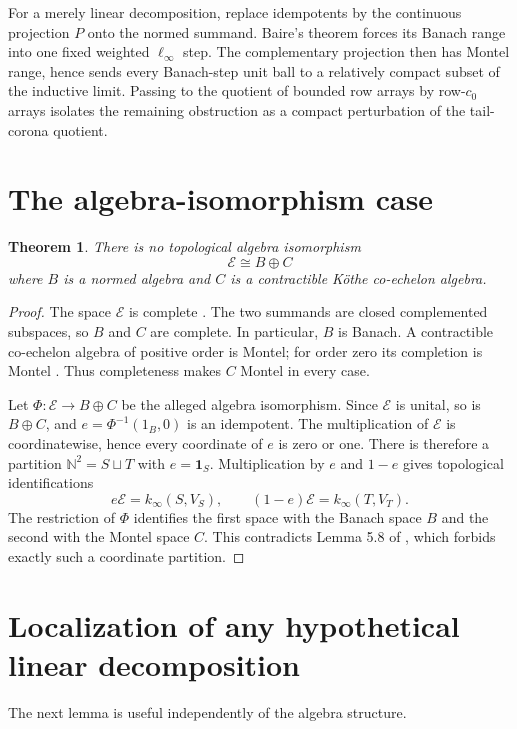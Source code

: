\documentclass[10pt]{article}
\newtheorem{theorem}{Theorem}
\newcommand{\N}{\mathbb N}
\newcommand{\E}{\mathcal E}
\begin{document}
For a merely linear decomposition, replace idempotents by the continuous
projection $P$ onto the normed summand.  Baire's theorem forces its Banach
range into one fixed weighted $\ell_\infty$ step.  The complementary projection
then has Montel range, hence sends every Banach-step unit ball to a relatively
compact subset of the inductive limit.  Passing to the quotient of bounded row
arrays by row-$c_0$ arrays isolates the remaining obstruction as a compact
perturbation of the tail-corona quotient.

\section*{The algebra-isomorphism case}

\begin{theorem}\label{thm:algebra}
There is no topological algebra isomorphism
\[
             \E\cong B\oplus C
\]
where $B$ is a normed algebra and $C$ is a contractible K\"othe co-echelon
algebra.
\end{theorem}

\begin{proof}
The space $\E$ is complete \cite[Theorem 2.3]{BMS}.  The two summands are
closed complemented subspaces, so $B$ and $C$ are complete.  In particular,
$B$ is Banach.  A contractible co-echelon algebra of positive order is Montel;
for order zero its completion is Montel \cite[Theorems 12 and 13]{Piszczek}.
Thus completeness makes $C$ Montel in every case.

Let $\Phi:\E\to B\oplus C$ be the alleged algebra isomorphism.  Since $\E$ is
unital, so is $B\oplus C$, and $e=\Phi^{-1}(1_B,0)$ is an idempotent.  The
multiplication of $\E$ is coordinatewise, hence every coordinate of $e$ is
zero or one.  There is therefore a partition $\N^2=S\sqcup T$ with
$e=\mathbf 1_S$.  Multiplication by $e$ and $1-e$ gives topological
identifications
\[
 e\E=k_\infty(S,V_S),\qquad (1-e)\E=k_\infty(T,V_T).
\]
The restriction of $\Phi$ identifies the first space with the Banach space
$B$ and the second with the Montel space $C$.  This contradicts Lemma 5.8 of
\cite{PP}, which forbids exactly such a coordinate partition.
\end{proof}

\section*{Localization of any hypothetical linear decomposition}

The next lemma is useful independently of the algebra structure.
\end{document}
